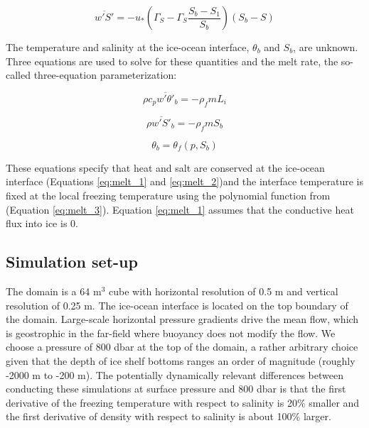 \documentclass[draft]{styles/agujournal2019}
\begin{document}
\begin{equation}
    \overline{w'S'} = -u_*
    (\Gamma_S - \Gamma_S \frac{S_b - S_1}{S_b})(S_b-S)
\end{equation}

The temperature and salinity at the ice-ocean interface, $\theta_b$ and $S_b$, are unknown. Three equations are used to solve for these quantities and the melt rate, the so-called three-equation parameterization:

\begin{equation}\label{eq:melt_1}
    \rho c_p \overline{w'\theta'}_b = -\rho_f m L_i
\end{equation}

\begin{equation}\label{eq:melt_2}
    \rho \overline{w'S'}_b = −\rho_f m S_b
\end{equation}

\begin{equation}\label{eq:melt_3}
    \theta_b = \theta_f(p,S_b)
\end{equation}

These equations specify that heat and salt are conserved at the ice-ocean interface (Equations \ref{eq:melt_1} and \ref{eq:melt_2})and the interface temperature is fixed at the local freezing temperature using the polynomial function from \cite{jackett_2006} (Equation \ref{eq:melt_3}). Equation \ref{eq:melt_1} assumes that the conductive heat flux into ice is 0.

\subsection{Simulation set-up}

The domain is a 64 m$^3$ cube with horizontal resolution of 0.5 m and vertical resolution of 0.25 m. The ice-ocean interface is located on the top boundary of the domain. Large-scale horizontal pressure gradients drive the mean flow, which is geostrophic in the far-field where buoyancy does not modify the flow. We choose a pressure of 800 dbar at the top of the domain, a rather arbitrary choice given that the depth of ice shelf bottoms ranges an order of magnitude (roughly -2000 m to -200 m). The potentially dynamically relevant differences between conducting these simulations at surface pressure and 800 dbar is that the first derivative of the freezing temperature with respect to salinity is 20\% smaller and the first derivative of density with respect to salinity is about 100\% larger.
\end{document}
